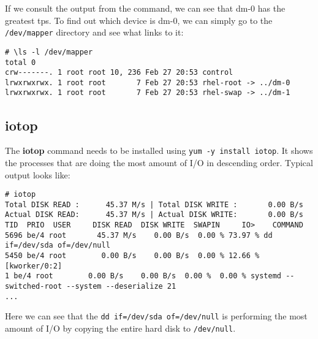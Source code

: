 If we consult the output from the command, we can see that dm-0 has the greatest tps. To find out which device is dm-0, we can simply go to the \verb|/dev/mapper| directory and see what links to it:

\vspace{-15pt}
\begin{verbatim}
# \ls -l /dev/mapper
total 0
crw-------. 1 root root 10, 236 Feb 27 20:53 control
lrwxrwxrwx. 1 root root       7 Feb 27 20:53 rhel-root -> ../dm-0
lrwxrwxrwx. 1 root root       7 Feb 27 20:53 rhel-swap -> ../dm-1
\end{verbatim}
\vspace{-10pt}	

\subsection{iotop}
The \textbf{iotop} command needs to be installed using \verb|yum -y install iotop|. It shows the processes that are doing the most amount of I/O in descending order. Typical output looks like:

\vspace{-15pt}
\begin{verbatim}
# iotop
Total DISK READ :      45.37 M/s | Total DISK WRITE :       0.00 B/s
Actual DISK READ:      45.37 M/s | Actual DISK WRITE:       0.00 B/s
TID  PRIO  USER     DISK READ  DISK WRITE  SWAPIN     IO>    COMMAND                                                       
5696 be/4 root       45.37 M/s    0.00 B/s  0.00 % 73.97 % dd if=/dev/sda of=/dev/null
5450 be/4 root        0.00 B/s    0.00 B/s  0.00 % 12.66 % [kworker/0:2]
1 be/4 root        0.00 B/s    0.00 B/s  0.00 %  0.00 % systemd --switched-root --system --deserialize 21
...
\end{verbatim}
\vspace{-10pt}	

\noindent
Here we can see that the \verb|dd if=/dev/sda of=/dev/null| is performing the most amount of I/O by copying the entire hard disk to \verb|/dev/null|. 